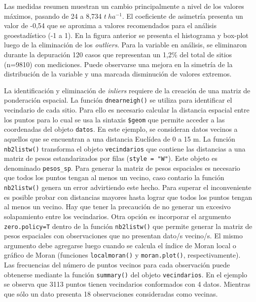 \documentclass[11pt,b5paper,]{krantz}
\begin{document}
Las medidas resumen muestran un cambio principalmente a nivel de los
valores máximos, pasando de 24 a 8,734 \(t\ ha^{-1}\). El coeficiente de
asimetría presenta un valor de -0,54 que se aproxima a valores
recomendados para el análisis geoestadístico (-1 a 1). En la figura
anterior se presenta el histograma y box-plot luego de la eliminación de
los \emph{outliers}. Para la variable en análisis, se eliminaron durante
la depuración 120 casos que representan un 1,2\% del total de sitios
(n=9810) con mediciones. Puede observarse una mejora en la simetría de
la distribución de la variable y una marcada disminución de valores
extremos.

La identificación y eliminación de \emph{inliers} requiere de la
creación de una matriz de ponderación espacial. La función
\texttt{dnearneigh()} se utiliza para identificar el vecindario de cada
sitio. Para ello es necesario calcular la distancia espacial entre los
puntos para lo cual se usa la sintaxis \texttt{\$geom} que permite
acceder a las coordenadas del objeto \texttt{datos}. En este ejemplo, se
consideran datos vecinos a aquellos que se encuentran a una distancia
Euclídea de 0 a 15 m. La función \texttt{nb2listw()} transforma el
objeto \texttt{vecindarios} que contiene las distancias a una matriz de
pesos estandarizados por filas (\texttt{style\ =\ "W"}). Este objeto es
denominado \texttt{pesos\_sp}. Para generar la matriz de pesos
espaciales es necesario que todos los puntos tengan al menos un vecino,
caso contario la función \texttt{nb2listw()} genera un error advirtiendo
este hecho. Para superar el inconveniente es posible probar con
distancias mayores hasta lograr que todos los puntos tengan al menos un
vecino. Hay que tener la precaución de no generar un excesivo
solapamiento entre los vecindarios. Otra opción es incorporar el
argumento \texttt{zero.policy=T} dentro de la función
\texttt{nb2listw()} que permite generar la matriz de pesos espaciales
con observaciones que no presentan dato/s vecino/s. El mismo argumento
debe agregarse luego cuando se calcula el índice de Moran local o
gráfico de Moran (funciones \texttt{localmoran()} y
\texttt{moran.plot()}, respectivamente). Las frecuencias del número de
puntos vecinos para cada observación puede obtenerse mediante la función
\texttt{summary()} del objeto \texttt{vecindarios}. En el ejemplo se
observa que 3113 puntos tienen vecindarios conformados con 4 datos.
Mientras que sólo un dato presenta 18 observaciones consideradas como
vecinas.
\end{document}
